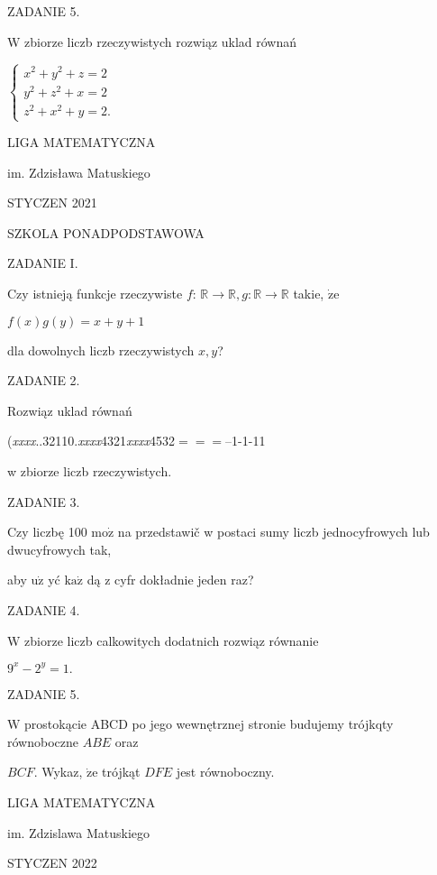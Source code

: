 \documentclass[a4paper,12pt]{article}
\begin{document}
ZADANIE 5.

$\mathrm{W}$ zbiorze liczb rzeczywistych rozwiąz uklad równań

$\left\{\begin{array}{l}
x^{2}+y^{2}+z=2\\
y^{2}+z^{2}+x=2\\
z^{2}+x^{2}+y=2.
\end{array}\right.$






LIGA MATEMATYCZNA

im. Zdzisława Matuskiego

STYCZEN 2021

SZKOLA PONADPODSTAWOWA

ZADANIE I.

Czy istnieją funkcje rzeczywiste $f$: $\mathbb{R}\rightarrow \mathbb{R}, g:\mathbb{R}\rightarrow \mathbb{R}$ takie, $\dot{\mathrm{z}}\mathrm{e}$

$f(x)g(y)=x+y+1$

dla dowolnych liczb rzeczywistych $x, y$?

ZADANIE 2.

Rozwiąz uklad równań

({\it xxxx}..32110.{\it xxxx}4321{\it xxxx}4532$===$--1-1-11

w zbiorze liczb rzeczywistych.

ZADANIE 3.

Czy liczbę 100 $\mathrm{m}\mathrm{o}\dot{\mathrm{z}}$ na przedstawič w postaci sumy liczb jednocyfrowych lub dwucyfrowych tak,

aby $\mathrm{u}\dot{\mathrm{z}}$ yć $\mathrm{k}\mathrm{a}\dot{\mathrm{z}}$ dą z cyfr dokładnie jeden raz?

ZADANIE 4.

$\mathrm{W}$ zbiorze liczb calkowitych dodatnich rozwiąz równanie

$9^{x}-2^{y}=1.$

ZADANIE 5.

$\mathrm{W}$ prostokącie ABCD po jego wewnętrznej stronie budujemy trójkqty równoboczne $ABE$ oraz

$BCF$. Wykaz, $\dot{\mathrm{z}}\mathrm{e}$ trójkąt $DFE$ jest równoboczny.






LIGA MATEMATYCZNA

im. Zdzislawa Matuskiego

STYCZEN 2022
\end{document}
